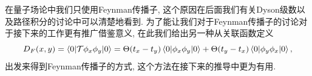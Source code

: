 
在量子场论中我们只使用Feynman传播子, 这个原因在后面我们有关Dyson级数以及路径积分的讨论中可以清楚地看到. 为了能让我们对于Feynman传播子的讨论对于接下来的工作更有推广借鉴意义, 在此我们给出另一种从关联函数定义
\begin{equation}
    D_F(x, y)=\braket{0|\mathcal T\phi_x\phi_y|0}=\Theta(t_x-t_y)\braket{0|\phi_x\phi_y|0}+\Theta(t_y-t_x)\braket{0|\phi_y\phi_x|0},
\end{equation}
出发来得到Feynman传播子的方式, 这个方法在接下来的推导中更为有用. 

